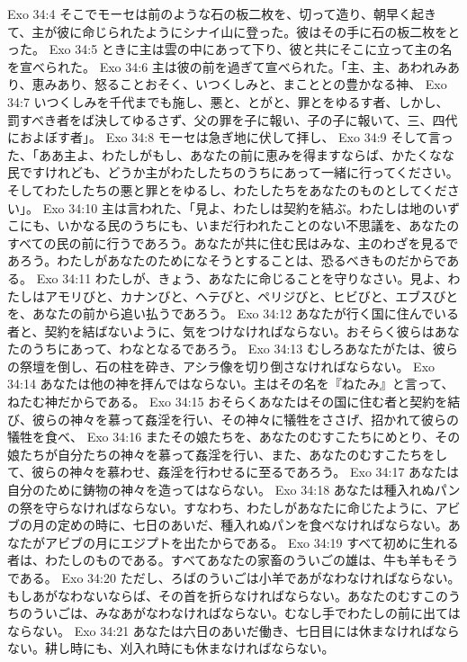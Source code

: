 Exo 34:4  そこでモーセは前のような石の板二枚を、切って造り、朝早く起きて、主が彼に命じられたようにシナイ山に登った。彼はその手に石の板二枚をとった。
Exo 34:5  ときに主は雲の中にあって下り、彼と共にそこに立って主の名を宣べられた。
Exo 34:6  主は彼の前を過ぎて宣べられた。「主、主、あわれみあり、恵みあり、怒ることおそく、いつくしみと、まこととの豊かなる神、
Exo 34:7  いつくしみを千代までも施し、悪と、とがと、罪とをゆるす者、しかし、罰すべき者をば決してゆるさず、父の罪を子に報い、子の子に報いて、三、四代におよぼす者」。
Exo 34:8  モーセは急ぎ地に伏して拝し、
Exo 34:9  そして言った、「ああ主よ、わたしがもし、あなたの前に恵みを得ますならば、かたくなな民ですけれども、どうか主がわたしたちのうちにあって一緒に行ってください。そしてわたしたちの悪と罪とをゆるし、わたしたちをあなたのものとしてください」。
Exo 34:10  主は言われた、「見よ、わたしは契約を結ぶ。わたしは地のいずこにも、いかなる民のうちにも、いまだ行われたことのない不思議を、あなたのすべての民の前に行うであろう。あなたが共に住む民はみな、主のわざを見るであろう。わたしがあなたのためになそうとすることは、恐るべきものだからである。
Exo 34:11  わたしが、きょう、あなたに命じることを守りなさい。見よ、わたしはアモリびと、カナンびと、ヘテびと、ペリジびと、ヒビびと、エブスびとを、あなたの前から追い払うであろう。
Exo 34:12  あなたが行く国に住んでいる者と、契約を結ばないように、気をつけなければならない。おそらく彼らはあなたのうちにあって、わなとなるであろう。
Exo 34:13  むしろあなたがたは、彼らの祭壇を倒し、石の柱を砕き、アシラ像を切り倒さなければならない。
Exo 34:14  あなたは他の神を拝んではならない。主はその名を『ねたみ』と言って、ねたむ神だからである。
Exo 34:15  おそらくあなたはその国に住む者と契約を結び、彼らの神々を慕って姦淫を行い、その神々に犠牲をささげ、招かれて彼らの犠牲を食べ、
Exo 34:16  またその娘たちを、あなたのむすこたちにめとり、その娘たちが自分たちの神々を慕って姦淫を行い、また、あなたのむすこたちをして、彼らの神々を慕わせ、姦淫を行わせるに至るであろう。
Exo 34:17  あなたは自分のために鋳物の神々を造ってはならない。
Exo 34:18  あなたは種入れぬパンの祭を守らなければならない。すなわち、わたしがあなたに命じたように、アビブの月の定めの時に、七日のあいだ、種入れぬパンを食べなければならない。あなたがアビブの月にエジプトを出たからである。
Exo 34:19  すべて初めに生れる者は、わたしのものである。すべてあなたの家畜のういごの雄は、牛も羊もそうである。
Exo 34:20  ただし、ろばのういごは小羊であがなわなければならない。もしあがなわないならば、その首を折らなければならない。あなたのむすこのうちのういごは、みなあがなわなければならない。むなし手でわたしの前に出てはならない。
Exo 34:21  あなたは六日のあいだ働き、七日目には休まなければならない。耕し時にも、刈入れ時にも休まなければならない。

